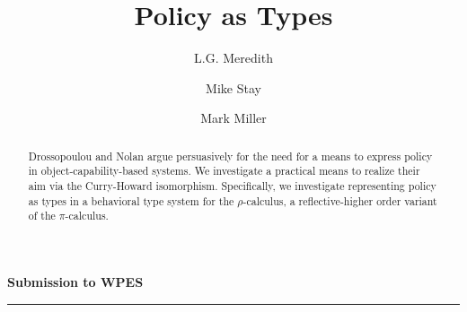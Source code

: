 \documentclass[]{amsart}
\theoremstyle{definition}
\theoremstyle{remark}
\numberwithin{equation}{subsection}
\newcommand{\pic}{$\pi$-calculus}
\newcommand{\rhoc}{$\rho$-calculus}
\newcommand{\papertitle}{Policy as Types}
\begin{document}
\lstset{language=}

\setlength{\topmargin}{0in}
\setlength{\textheight}{8.5in}
\setlength{\parskip}{6pt}

\title{\papertitle}

\author{ L.G. Meredith }
\author{ Mike Stay }
\author{ Mark Miller }







\dedicatory{}



\begin{abstract}
\normalsize{ 

  Drossopoulou and Nolan \cite{Drossopoulou:2013:NCP:2489804.2489811}
  argue persuasively for the need for a means to express policy in
  object-capability-based systems. We investigate a practical means to
  realize their aim via the Curry-Howard isomorphism. Specifically, we
  investigate representing policy as types in a behavioral type system
  for the \rhoc, a reflective-higher order variant of the \pic.

}

\end{abstract}

\noindent
{\large \textbf{Submission to WPES}}\\
\rule{6.25in}{0.75pt}\\\\\\

\maketitle
\end{document}
